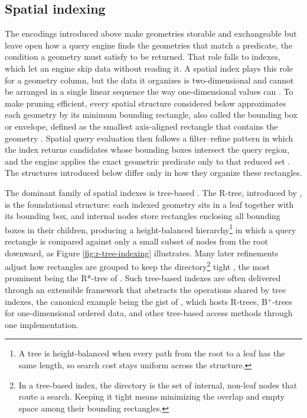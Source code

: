 \subsection{Spatial indexing}
\label{background:geometry-and-indexing:spatial-indexing}
The encodings introduced above make geometries storable and exchangeable but leave open how a query engine finds the geometries that match a predicate, the condition a geometry must satisfy to be returned. That role falls to indexes, which let an engine skip data without reading it. A spatial index plays this role for a geometry column, but the data it organizes is two-dimensional and cannot be arranged in a single linear sequence the way one-dimensional values can \parencite{guttman1984_rtree_dynamic_index}. To make pruning efficient, every spatial structure considered below approximates each geometry by its minimum bounding rectangle, also called the bounding box or envelope, defined as the smallest axis-aligned rectangle that contains the geometry \parencite{herring2011_simple_feature_access_part1}. Spatial query evaluation then follows a filter--refine pattern in which the index returns candidates whose bounding boxes intersect the query region, and the engine applies the exact geometric predicate only to that reduced set \parencite{orenstein1986_spatial_query_processing}. The structures introduced below differ only in how they organize these rectangles.

The dominant family of spatial indexes is tree-based \parencite{gaede1998_multidimensional_access_methods}. The R-tree, introduced by \textcite{guttman1984_rtree_dynamic_index}, is the foundational structure: each indexed geometry sits in a leaf together with its bounding box, and internal nodes store rectangles enclosing all bounding boxes in their children, producing a height-balanced hierarchy\footnote{A tree is height-balanced when every path from the root to a leaf has the same length, so search cost stays uniform across the structure.} in which a query rectangle is compared against only a small subset of nodes from the root downward, as Figure \ref{fig:r-tree-indexing} illustrates. Many later refinements adjust how rectangles are grouped to keep the directory\footnote{In a tree-based index, the directory is the set of internal, non-leaf nodes that route a search. Keeping it tight means minimizing the overlap and empty space among their bounding rectangles.} tight \parencite{gaede1998_multidimensional_access_methods}, the most prominent being the R*-tree of \textcite{beckmann1990_rstar_tree_efficient_robust}. Such tree-based indexes are often delivered through an extensible framework that abstracts the operations shared by tree indexes, the canonical example being the \acrfull{gist} of \textcite{hellerstein1995_generalized_search_trees_database_systems}, which hosts R-trees, B$^{+}$-trees for one-dimensional ordered data, and other tree-based access methods through one implementation.

